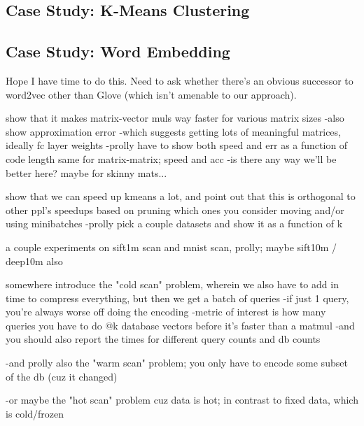 \subsection{Case Study: K-Means Clustering}

\subsection{Case Study: Word Embedding}

Hope I have time to do this. Need to ask whether there's an obvious successor to word2vec other than Glove (which isn't amenable to our approach).


show that it makes matrix-vector muls way faster for various matrix sizes
    -also show approximation error
        -which suggests getting lots of meaningful matrices, ideally fc layer weights
    -prolly have to show both speed and err as a function of code length
same for matrix-matrix; speed and acc
    -is there any way we'll be better here? maybe for skinny mats...

show that we can speed up kmeans a lot, and point out that this is orthogonal to other ppl's speedups based on pruning which ones you consider moving and/or using minibatches
    -prolly pick a couple datasets and show it as a function of k

a couple experiments on sift1m scan and mnist scan, prolly; maybe sift10m / deep10m also

somewhere introduce the "cold scan" problem, wherein we also have to add in time to compress everything, but then we get a batch of queries
    -if just 1 query, you're always worse off doing the encoding
    -metric of interest is how many queries you have to do @k database vectors before it's faster than a matmul
        -and you should also report the times for different query counts and db counts

    -and prolly also the "warm scan" problem; you only have to encode some subset of the db (cuz it changed)

    -or maybe the "hot scan" problem cuz data is hot; in contrast to fixed data, which is cold/frozen



